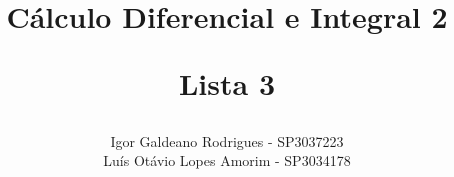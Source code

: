 \documentclass[a4paper, 12pt]{article}
\title{Cálculo Diferencial e Integral 2

Lista 3}
\author{
Igor Galdeano Rodrigues - SP3037223
\\
Luís Otávio Lopes Amorim - SP3034178}
\begin{document}
	\maketitle
	\begin{enumerate}
		
		\pagebreak
		
		
		
		
		
	\end{enumerate}
\end{document}
